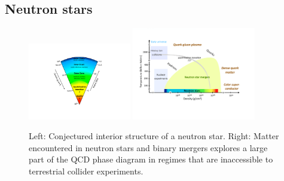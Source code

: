    
\subsection{Neutron stars} 

\begin{figure}[t]
 \centering
 \includegraphics[width=0.40\textwidth]{Figures/NS_pie_new.pdf}\qquad\qquad
  \includegraphics[width=0.48\textwidth]{Figures/phase_diagram_new.pdf}
 \caption{Left: Conjectured interior structure of a neutron star.  Right:
Matter encountered in neutron stars and binary mergers explores a large part of the QCD phase diagram in regimes that are inaccessible to terrestrial collider experiments.}
\label{fig:NSs}
\end{figure}



